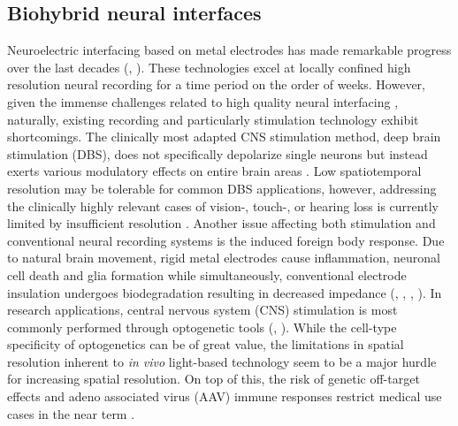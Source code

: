 \subsection{Biohybrid neural interfaces}
Neuroelectric interfacing based on metal electrodes has made remarkable progress
over the last decades (\cite{utaharray}, \cite{neuropixel}). These technologies
excel at locally confined high resolution neural recording for a time period on
the order of weeks. However, given the immense challenges related to high
quality neural interfacing \parencite{mooreslaw}, naturally, existing recording
and particularly stimulation technology exhibit shortcomings.
The clinically most adapted CNS stimulation method, deep brain stimulation
(DBS), does not specifically depolarize single neurons but instead exerts
various modulatory effects on entire brain areas \parencite{dbs}. Low
spatiotemporal resolution may be tolerable for common DBS applications, however,
addressing the clinically highly relevant cases of vision-, touch-, or hearing
loss is currently limited by insufficient resolution
\parencite{retinastimulation}. Another issue affecting both stimulation and
conventional neural recording systems is the induced foreign body response. Due
to natural brain movement, rigid metal electrodes cause inflammation, neuronal
cell death and glia formation while simultaneously, conventional electrode
insulation undergoes biodegradation resulting in decreased impedance
(\cite{eletrodeproblems1}, \cite{eletrodeproblems2}, \cite{eletrodeproblems3},
\cite{eletrodeproblems4}). In research applications, central nervous system
(CNS) stimulation is most commonly performed through optogenetic tools
(\cite{optog1}, \cite{optog2}). While the cell-type specificity of optogenetics
can be of great value, the limitations in spatial resolution inherent to
\textit{in vivo} light-based technology seem to be a major hurdle for increasing
spatial resolution. On top of this, the risk of genetic off-target effects and
adeno associated virus (AAV) immune responses restrict medical use cases in the
near term \parencite{optogImmunresponse}. \\


